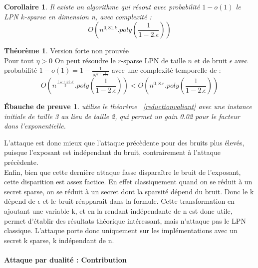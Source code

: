 \documentclass{article}		%
\theoremstyle{definition}
\newtheorem{theo}{Théorème}
\theoremstyle{plain}
\newtheorem{intui}{Ébauche de preuve}
\theoremstyle{plain}
\newtheorem{coro}{Corollaire}
\theoremstyle{plain}
\theoremstyle{plain}
\theoremstyle{plain}
\begin{document}
\begin{coro}
Il existe un algorithme qui résout avec probabilité $1-o(1)$ le LPN $k$-sparse en dimension n, avec
complexité :
$$O(n^{0,81.k}.poly(\frac{1}{1-2.\epsilon}))$$
\end{coro}

\begin{theo}{Version forte non prouvée}
\\
Pour tout $\eta>0$
On peut résoudre le $r$-sparse LPN de taille $n$ et de bruit $\epsilon$
avec probabilité $1-o(1)=1-\frac{1}{N^{\eta+\frac{1}{4-\epsilon}}}$ avec une complexité temporelle de :
$$O(n^{\frac{(\omega+\eta).r}{3}}.poly(\frac{1}{1-2.\epsilon}))<
O(n^{0,8.r}.poly(\frac{1}{1-2.\epsilon}))$$
\end{theo}
\begin{intui}
\cite{Valiant} utilise le théorème ~\ref{reductionvaliant} avec une instance
initiale de taille 3 au lieu de taille 2, qui permet un gain 0.02 pour le
facteur dans
l'exponentielle.
\end{intui}

L'attaque est donc mieux que l'attaque précèdente pour
des bruits plus élevés, puisque l'exposant est indépendant du bruit,
contrairement à l'attaque précèdente.
\\
Enfin, bien que cette dernière attaque fasse disparaître le bruit de
l'exposant, cette disparition est assez factice. En effet
classiquement quand on se réduit à un secret sparse, on se réduit à un
secret dont la sparsité dépend du bruit. Donc le k dépend de $\epsilon$
et le bruit réapparait dans la formule. Cette transformation en ajoutant
une variable k, et en la rendant indépendante de n est donc utile, permet
d'établir des résultats théorique intéressant, mais n'attaque pas le LPN
classique. L'attaque porte donc uniquement sur les implémentations avec
un secret k sparse, k indépendant de n. 

\paragraph{Attaque par dualité : Contribution} 
\end{document}
